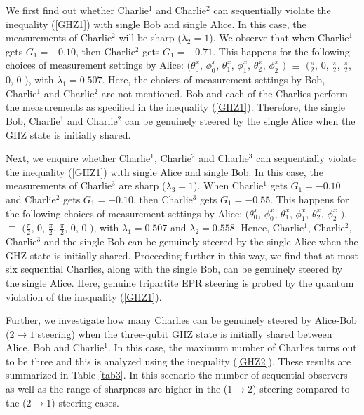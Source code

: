 \documentclass[pra,a4paper,aps,twocolumn,showpacs,superscriptaddress,groupedaddress]{revtex4}
\begin{document}
We first find out whether Charlie$^1$ and Charlie$^2$ can sequentially violate the inequality (\ref{GHZ1}) with single Bob and single Alice. In this case, the measurements of Charlie$^2$ will be sharp ($\lambda_2 = 1$). We observe that when  Charlie$^1$ gets $G_1 = -0.10$, then Charlie$^2$ gets $G_1 = -0.71$.  This happens for the following choices of measurement settings by Alice:  $( \theta^{x}_0$, $\phi^{x}_0$, $\theta^{x}_1$, $\phi^{x}_1$, $\theta^{x}_2$, $\phi^{x}_2$ $)$ $\equiv$ $( \frac{\pi}{2}$, $0$, $\frac{\pi}{2}$, $\frac{\pi}{2}$, $0$, $0$ $)$, with $\lambda_1 = 0.507$. Here, the choices of measurement settings by Bob, Charlie$^1$ and Charlie$^2$ are not mentioned. Bob and each of the Charlies perform the measurements as specified in the inequality (\ref{GHZ1}). Therefore, the single Bob, Charlie$^1$ and Charlie$^2$ can be genuinely steered  by the single Alice when the GHZ state is initially shared.

Next, we enquire whether Charlie$^1$, Charlie$^2$ and Charlie$^3$ can sequentially violate the inequality (\ref{GHZ1}) with single Alice and single Bob. In this case, the measurements of Charlie$^3$ are sharp ($\lambda_3 = 1$). When Charlie$^1$ gets $G_1 = -0.10$ and Charlie$^2$ gets $G_1 = -0.10$, then Charlie$^3$ gets $G_1 = -0.55$.  This happens for the following choices of measurement settings by Alice: $( \theta^{x}_0$, $\phi^{x}_0$, $\theta^{x}_1$, $\phi^{x}_1$, $\theta^{x}_2$, $\phi^{x}_2$ $)$, $\equiv$ $( \frac{\pi}{2}$, $0$, $\frac{\pi}{2}$, $\frac{\pi}{2}$, $0$, $0$ $)$, with $\lambda_1 = 0.507$ and $\lambda_2 = 0.558$. Hence, Charlie$^1$, Charlie$^2$, Charlie$^3$ and the single Bob can be genuinely steered by the single Alice  when the GHZ state is initially shared.
Proceeding further in this way, we find that at most six sequential Charlies, along with the single Bob, can be genuinely steered by the single Alice.  Here, genuine tripartite EPR steering is probed by the quantum violation of the inequality  (\ref{GHZ1}).


Further, we investigate how many Charlies  can be  genuinely steered by Alice-Bob ($2 \rightarrow 1$ steering) when the three-qubit GHZ state is initially shared between Alice, Bob and Charlie$^1$. In this case, the maximum number of Charlies turns out to be three and this is analyzed using the inequality (\ref{GHZ2}). These results are summarized in Table \ref{tab3}. In this scenario the number of sequential observers as well as the range of sharpness are higher in the ($1 \rightarrow 2$) steering compared to the ($2 \rightarrow 1$) steering cases. %
\end{document}
